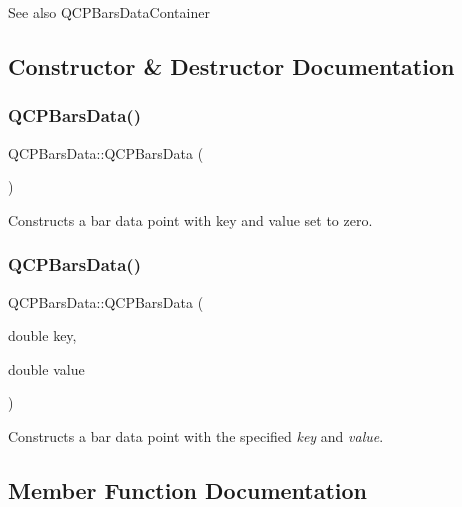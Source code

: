 \begin{DoxySeeAlso}{See also}
Q\+C\+P\+Bars\+Data\+Container 
\end{DoxySeeAlso}


\subsection{Constructor \& Destructor Documentation}
\mbox{\label{class_q_c_p_bars_data_a800794d4c5fea22eeb8bade20798496b}} 
\subsubsection{\texorpdfstring{Q\+C\+P\+Bars\+Data()}{QCPBarsData()}\hspace{0.1cm}{\footnotesize\ttfamily [1/2]}}
{\footnotesize\ttfamily Q\+C\+P\+Bars\+Data\+::\+Q\+C\+P\+Bars\+Data (\begin{DoxyParamCaption}{ }\end{DoxyParamCaption})}

Constructs a bar data point with key and value set to zero. \mbox{\label{class_q_c_p_bars_data_a4158816a69e2c675885f48afa2b5acc9}} 
\subsubsection{\texorpdfstring{Q\+C\+P\+Bars\+Data()}{QCPBarsData()}\hspace{0.1cm}{\footnotesize\ttfamily [2/2]}}
{\footnotesize\ttfamily Q\+C\+P\+Bars\+Data\+::\+Q\+C\+P\+Bars\+Data (\begin{DoxyParamCaption}\item[{double}]{key,  }\item[{double}]{value }\end{DoxyParamCaption})}

Constructs a bar data point with the specified {\itshape key} and {\itshape value}. 

\subsection{Member Function Documentation}
\mbox{\label{class_q_c_p_bars_data_ad170d4e90498005ec319338910252ba8}} 
